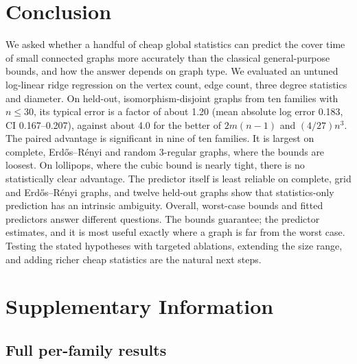 \documentclass{article}
\begin{document}
\section{Conclusion}
\label{sec:conclusion}
We asked whether a handful of cheap global statistics can predict the cover time of small connected graphs more accurately than the classical general-purpose bounds, and how the answer depends on graph type. We evaluated an untuned log-linear ridge regression on the vertex count, edge count, three degree statistics and diameter. On held-out, isomorphism-disjoint graphs from ten families with $n\le 30$, its typical error is a factor of about 1.20 (mean absolute log error 0.183, CI 0.167--0.207), against about 4.0 for the better of $2m(n-1)$ and $(4/27)n^3$. The paired advantage is significant in nine of ten families. It is largest on complete, Erd\H{o}s--R\'enyi and random 3-regular graphs, where the bounds are loosest. On lollipops, where the cubic bound is nearly tight, there is no statistically clear advantage. The predictor itself is least reliable on complete, grid and Erd\H{o}s--R\'enyi graphs, and twelve held-out graphs show that statistics-only prediction has an intrinsic ambiguity. Overall, worst-case bounds and fitted predictors answer different questions. The bounds guarantee; the predictor estimates, and it is most useful exactly where a graph is far from the worst case. Testing the stated hypotheses with targeted ablations, extending the size range, and adding richer cheap statistics are the natural next steps.

\clearpage



\clearpage
\appendix
\section{Supplementary Information}

\subsection{Full per-family results}
\label{sec:si_family}
\end{document}
